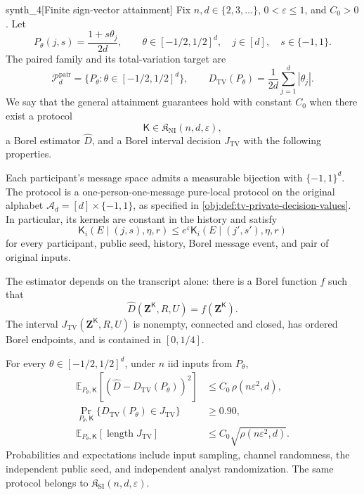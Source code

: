 \begin{definitionv}{synth_4}[Finite sign-vector attainment]
Fix \(n,d\in\{2,3,\ldots\}\), \(0<\varepsilon\le1\), and \(C_0>0\). Let
\[
P_\theta(j,s)=\frac{1+s\theta_j}{2d},
\qquad
\theta\in[-1/2,1/2]^d,\quad j\in[d],\quad s\in\{-1,1\}.
\]
The paired family and its total-variation target are
\[
\mathcal P_d^{\mathrm{pair}}
=\{P_\theta:\theta\in[-1/2,1/2]^d\},
\qquad
D_{\mathrm{TV}}(P_\theta)
=\frac1{2d}\sum_{j=1}^d|\theta_j|.
\]
We say that the general attainment guarantees hold with constant \(C_0\) when there exist a protocol
\[
\mathsf K\in\mathfrak K_{\mathrm{NI}}(n,d,\varepsilon),
\]
a Borel estimator \(\widehat D\), and a Borel interval decision \(J_{\mathrm{TV}}\) with the following properties.

Each participant's message space admits a measurable bijection with \(\{-1,1\}^d\). The protocol is a one-person-one-message pure-local protocol on the original alphabet \(\mathcal A_d=[d]\times\{-1,1\}\), as specified in \cref{obj:def:tv-private-decision-values}. In particular, its kernels are constant in the history and satisfy
\[
\mathsf K_i(E\mid(j,s),\eta,r)
\le e^\varepsilon
\mathsf K_i(E\mid(j',s'),\eta,r)
\]
for every participant, public seed, history, Borel message event, and pair of original inputs.

The estimator depends on the transcript alone: there is a Borel function \(f\) such that
\[
\widehat D(\mathbf Z^{\mathsf K},R,U)=f(\mathbf Z^{\mathsf K}).
\]
The interval \(J_{\mathrm{TV}}(\mathbf Z^{\mathsf K},R,U)\) is nonempty, connected and closed, has ordered Borel endpoints, and is contained in \([0,1/4]\).

For every \(\theta\in[-1/2,1/2]^d\), under \(n\) iid inputs from \(P_\theta\),
\[
\begin{aligned}
\mathbb E_{P_\theta,\mathsf K}
\left[(\widehat D-D_{\mathrm{TV}}(P_\theta))^2\right]
&\le C_0\,\rho(n\varepsilon^2,d),\\
\Pr_{P_\theta,\mathsf K}
\{D_{\mathrm{TV}}(P_\theta)\in J_{\mathrm{TV}}\}
&\ge0.90,\\
\mathbb E_{P_\theta,\mathsf K}
\left[\operatorname{length}J_{\mathrm{TV}}\right]
&\le C_0\sqrt{\rho(n\varepsilon^2,d)}.
\end{aligned}
\]
Probabilities and expectations include input sampling, channel randomness, the independent public seed, and independent analyst randomization. The same protocol belongs to \(\mathfrak K_{\mathrm{SI}}(n,d,\varepsilon)\).
\end{definitionv}

